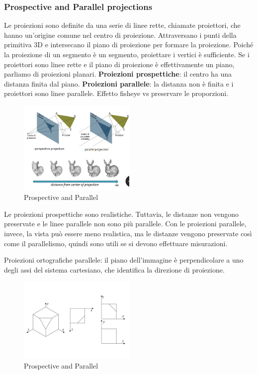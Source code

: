 \subsubsection{Prospective and Parallel projections}
Le proiezioni sono definite da una serie di linee rette, chiamate proiettori, che hanno un'origine comune nel centro di proiezione. Attraversano i punti della primitiva 3D e intersecano il piano di proiezione per formare la proiezione. Poiché la proiezione di un segmento è un segmento, proiettare i vertici è sufficiente. Se i proiettori sono linee rette e il piano di proiezione è effettivamente un piano, parliamo di proiezioni planari.
\textbf{Proiezioni prospettiche}: il centro ha una distanza finita dal piano.
\textbf{Proiezioni parallele}: la distanza non è finita e i proiettori sono linee parallele.
Effetto fisheye vs preservare le proporzioni.
\begin{figure}[H]
    \centering
    \includegraphics[width=0.5\textwidth]{images/ProspParall.png} 
    \caption{Prospective and Parallel}
    \label{fig:immagine}
\end{figure}
Le proiezioni prospettiche sono realistiche. Tuttavia, le distanze non vengono preservate e le linee parallele non sono più parallele.
Con le proiezioni parallele, invece, la vista può essere meno realistica, ma le distanze vengono preservate così come il parallelismo, quindi sono utili se si devono effettuare misurazioni.

Proiezioni ortografiche parallele: il piano dell'immagine è perpendicolare a uno degli assi del sistema cartesiano, che identifica la direzione di proiezione.
\begin{figure}[H]
    \centering
    \includegraphics[width=0.5\textwidth]{images/ParOrth.png} 
    \caption{Prospective and Parallel}
    \label{fig:immagine}
\end{figure}

